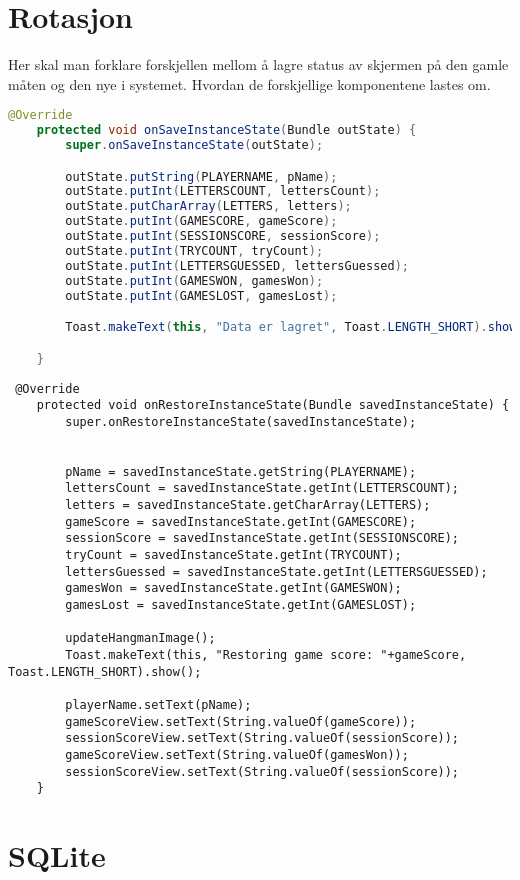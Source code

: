 \section{Rotasjon}
Her skal man forklare forskjellen mellom å lagre status av skjermen på den gamle måten og den nye i systemet. Hvordan de forskjellige komponentene lastes om. 
\begin{lstlisting}[language=Java]
    @Override
    protected void onSaveInstanceState(Bundle outState) {
        super.onSaveInstanceState(outState);

        outState.putString(PLAYERNAME, pName);
        outState.putInt(LETTERSCOUNT, lettersCount);
        outState.putCharArray(LETTERS, letters);
        outState.putInt(GAMESCORE, gameScore);
        outState.putInt(SESSIONSCORE, sessionScore);
        outState.putInt(TRYCOUNT, tryCount);
        outState.putInt(LETTERSGUESSED, lettersGuessed);
        outState.putInt(GAMESWON, gamesWon);
        outState.putInt(GAMESLOST, gamesLost);

        Toast.makeText(this, "Data er lagret", Toast.LENGTH_SHORT).show();

    }
\end{lstlisting}

\begin{lstlisting}
 @Override
    protected void onRestoreInstanceState(Bundle savedInstanceState) {
        super.onRestoreInstanceState(savedInstanceState);


        pName = savedInstanceState.getString(PLAYERNAME);
        lettersCount = savedInstanceState.getInt(LETTERSCOUNT);
        letters = savedInstanceState.getCharArray(LETTERS);
        gameScore = savedInstanceState.getInt(GAMESCORE);
        sessionScore = savedInstanceState.getInt(SESSIONSCORE);
        tryCount = savedInstanceState.getInt(TRYCOUNT);
        lettersGuessed = savedInstanceState.getInt(LETTERSGUESSED);
        gamesWon = savedInstanceState.getInt(GAMESWON);
        gamesLost = savedInstanceState.getInt(GAMESLOST);

        updateHangmanImage();
        Toast.makeText(this, "Restoring game score: "+gameScore, Toast.LENGTH_SHORT).show();

        playerName.setText(pName);
        gameScoreView.setText(String.valueOf(gameScore));
        sessionScoreView.setText(String.valueOf(sessionScore));
        gameScoreView.setText(String.valueOf(gamesWon));
        sessionScoreView.setText(String.valueOf(sessionScore));
    }
\end{lstlisting}

\section{SQLite}